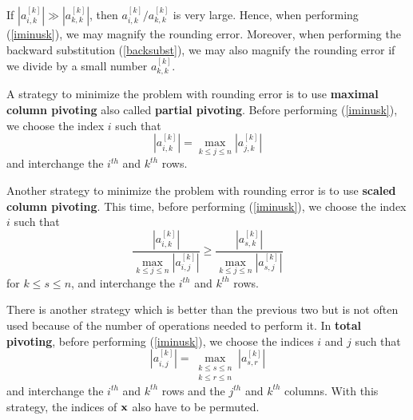 \begin{rmk}
If $|a^{[k]}_{i,k}| \gg |a^{[k]}_{k,k}|$, then
$a^{[k]}_{i,k} / a^{[k]}_{k,k}$ is very large.  Hence, when performing
(\ref{iminusk}), we may magnify the rounding error.  Moreover, when
performing the backward substitution (\ref{backsubst}), we may also
magnify the rounding error if we divide by a small number
$a^{[k]}_{k,k}$.

A strategy to minimize the problem with rounding error is to use
{\bfseries maximal column pivoting}
also called {\bfseries partial pivoting}.
Before performing (\ref{iminusk}), we choose the index $i$ such
that
\[
|a^{[k]}_{i,k}|=\max_{k\leq j \leq n}|a^{[k]}_{j,k}|
\]
and interchange the $i^{th}$ and $k^{th}$ rows.

Another strategy to minimize the problem with rounding error is to use
{\bfseries scaled column pivoting}.
This time, before performing (\ref{iminusk}), we choose the index $i$
such that
\[
\frac{|a^{[k]}_{i,k}|}{\displaystyle \max_{k\leq j \leq n}|a^{[k]}_{i,j}|} \geq
\frac{|a^{[k]}_{s,k}|}{\displaystyle \max_{k\leq j \leq n}|a^{[k]}_{s,j}|}
\]
for $k\leq s \leq n$, and interchange the $i^{th}$ and $k^{th}$ rows.

There is another strategy which is better than the previous two but is
not often used because of the number of operations needed to perform
it.  In {\bfseries total pivoting}, before
performing (\ref{iminusk}), we choose the indices $i$ and $j$ such that
\[
|a^{[k]}_{i,j}|=\max_{\substack{k\leq s \leq n\\k\leq r \leq n}}
|a^{[k]}_{s,r}|
\]
and interchange the $i^{th}$ and $k^{th}$ rows and the $j^{th}$ and
$k^{th}$ columns.  With this strategy, the indices of $\mathbf{x}$ also
have to be permuted.
\end{rmk}

